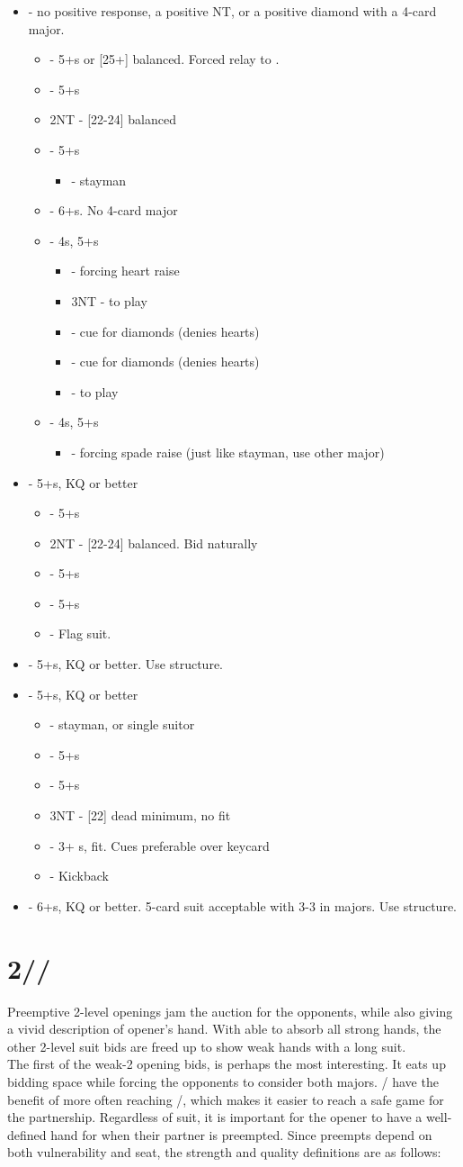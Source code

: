 \documentclass[12pt]{report}
\newcommand{\n}{\\}
\newcommand{\ul}[1]{\begin{itemize}#1\end{itemize}}
\newcommand{\li}{\item[~]}
\newcommand{\bidsection}[2]{\section{\texorpdfstring{#1}{#2}}}
\begin{document}
    \ul {
        \li {} - no positive response, a positive NT, or a positive diamond with a 4-card major.
        \ul {
            \li \he2 - 5+\he{}s or [25+] balanced.  Forced relay to \sp2.
            \li \sp2 - 5+\sp{}s
            \li 2NT - [22-24] balanced
            \li \cl3 - 5+\cl{}s
            \ul {
                \li \di3 - stayman
            }
            \li \di3 - 6+\di{}s.  No 4-card major
            \li \he3 - 4\he{}s, 5+\di{}s
            \ul {
                \li \sp3 - forcing heart raise
                \li 3NT - to play
                \li \cl4 - cue for diamonds (denies hearts)
                \li \di4 - cue for diamonds (denies hearts)
                \li \he4 - to play
            }
            \li \sp3 - 4\sp{}s, 5+\di{}s
            \ul {
                \li \he4 - forcing spade raise (just like stayman, use other major)
            }
        }
        \li \he2 - 5+\he{}s, KQ or better
        \ul {
            \li \sp2 - 5+\sp{}s
            \li 2NT - [22-24] balanced.  Bid naturally
            \li \cl3 - 5+\cl{}s
            \li \di3 - 5+\di{}s
            \li \he3 - Flag suit.
        }

        \li \sp2 - 5+\sp{}s, KQ or better.  Use \he2 structure.
        \li \cl3 - 5+\cl{}s, KQ or better
        \ul {
            \li \di3 - stayman, or \di{} single suitor
            \li \he3 - 5+\he{}s
            \li \sp3 - 5+\sp{}s
            \li 3NT - [22] dead minimum, no fit
            \li \cl4 - 3+ \cl{}s, fit.  Cues preferable over keycard
            \li \di4 - Kickback
        }
        \li \di3 - 6+\di{}s, KQ or better.  5-card suit acceptable with 3-3 in majors.  Use \cl3 structure.
    }

\bidsection{2\di{}/\he{}/\sp{}}{2♢/♡/♠} \label{2:8}

    Preemptive 2-level openings jam the auction for the opponents, while also giving a vivid description of opener's hand.  With  able to absorb all strong hands, the other 2-level suit bids are freed up to show weak hands with a long suit. \n

    The first of the weak-2 opening bids,  is perhaps the most interesting.  It eats up bidding space while forcing the opponents to consider both majors.  / have the benefit of more often reaching /, which makes it easier to reach a safe game for the partnership.  Regardless of suit, it is important for the opener to have a well-defined hand for when their partner is preempted.  Since preempts depend on both vulnerability and seat, the strength and quality definitions are as follows:
\end{document}
